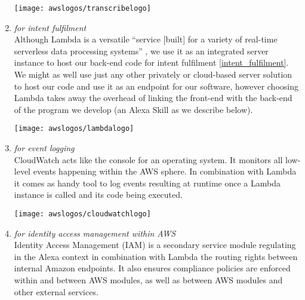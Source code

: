 \begin{enumerate}
	
	\begin{restoretext}
\begin{flushright}
	\texttt{[image: awslogos/transcribelogo]}
\end{flushright}
	\end{restoretext}
	
	
	\item[\href{https://aws.amazon.com/lambda/}{\textbf{Lambda}} \footnote{\url{https://aws.amazon.com/lambda}}] \textit{for intent fulfilment}\\
	Although Lambda is a versatile ``service [built] for a variety of real-time serverless data processing systems'' \cite{aws_website}, we use it as an integrated server instance to host our back-end code for intent fulfilment \ref{intent_fulfilment}. We might as well use just any other privately or cloud-based server solution to host our code and use it as an endpoint for our software, however choosing Lambda takes away the overhead of linking the front-end with the back-end of the program we develop (an Alexa Skill as we describe below). 
	
	
	\begin{restoretext}
\begin{flushright}
	\texttt{[image: awslogos/lambdalogo]}
\end{flushright}
	\end{restoretext}


	\item[\href{https://aws.amazon.com/iam/}{\textbf{CloudWatch}} \footnote{\url{https://aws.amazon.com/cloudwatch}}]
	\textit{for event logging}\\
	CloudWatch acts like the console for an operating system. It monitors all low-level events happening within the AWS sphere. In combination with Lambda it comes as handy tool to log events resulting at runtime once a Lambda instance is called and its code being executed.
	
	
	\begin{restoretext}
\begin{flushright}
	\texttt{[image: awslogos/cloudwatchlogo]}
\end{flushright}
	\end{restoretext}


	\item[\href{https://aws.amazon.com/iam/}{\textbf{IAM}} \footnote{\url{https://aws.amazon.com/iam}}]
	\textit{for identity access management within AWS}\\
	Identity Access Management (IAM) is a secondary service module regulating in the Alexa context in combination with Lambda the routing rights between internal Amazon endpoints. It also ensures compliance policies are enforced within and between AWS modules, as well as between AWS modules and other external services.
	

\end{enumerate}
